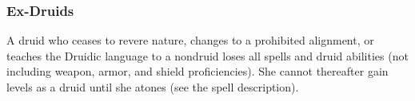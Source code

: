 \begin{comment}
\par Medium sized animals deal d4 damage with claw, hoof, and talon attacks, and d6 damage with bite attacks. Small sized animals deal d3 damage with claw, hoof, talon attacks, and d4 damage with bite attacks. Large sized animals deal d6 damage with claw, hoof, and talon attacks, and d8 damage with bite attacks.

\par Some animal companions have special abilities. Every animal companion has low-light vision, and every animal companion that is not a bird has scent. Vipers have a poisonous bite that deals initial and secondary damage of 1d6 Con. The save DC is equal to 10 \add 1/2 the viper's HV \add the viper's Con. A wolf that hits with a bite attack can attempt to trip the opponent as a free action without provoking attacks of opportunity.
\end{comment}
\subsubsection{Ex-Druids}
A druid who ceases to revere nature, changes to a prohibited alignment, or teaches the Druidic language to a nondruid loses all spells and druid abilities (not including weapon, armor, and shield proficiencies). She cannot thereafter gain levels as a druid until she atones (see the  spell description).

